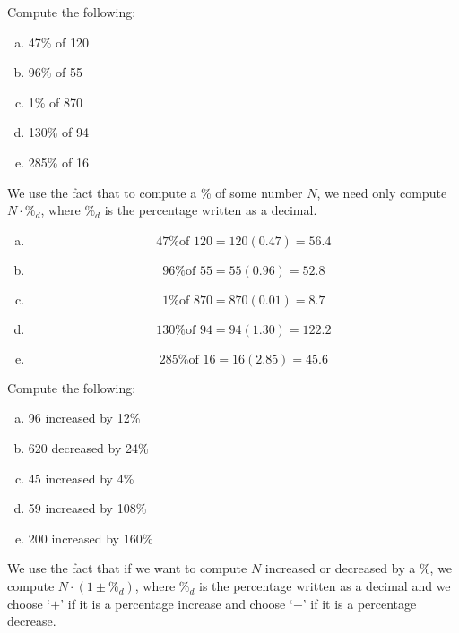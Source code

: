 \documentclass[11pt,letterpaper]{article}
\begin{document}

 Compute the following:
	\begin{enumerate}[(a)]
	\item 47\% of 120
	\item 96\% of 55
	\item 1\% of 870
	\item 130\% of 94
	\item 285\% of 16
	\end{enumerate} \pspace

\sol We use the fact that to compute a \% of some number $N$, we need only compute $N \cdot \%_d$, where $\%_d$ is the percentage written as a decimal. \pspace

\begin{enumerate}[(a)]
\item 
	\[
	\text{47\% of 120}= 120(0.47)= 56.4
	\] \pspace

\item 
	\[
	\text{96\% of 55}= 55(0.96)= 52.8
	\] \pspace

\item 
	\[
	\text{1\% of 870}= 870(0.01)= 8.7
	\] \pspace

\item 
	\[
	\text{130\% of 94}= 94(1.30)= 122.2
	\] \pspace

\item 
	\[
	\text{285\% of 16}= 16(2.85)= 45.6
	\] 
\end{enumerate}



\newpage



 Compute the following:
	\begin{enumerate}[(a)]
	\item 96 increased by 12\%
	\item 620 decreased by 24\%
	\item 45 increased by 4\% 
	\item 59 increased by 108\%
	\item 200 increased by 160\%
	\end{enumerate} \pspace

\sol We use the fact that if we want to compute $N$ increased or decreased by a \%, we compute $N \cdot (1 \pm \%_d)$, where $\%_d$ is the percentage written as a decimal and we choose `$+$' if it is a percentage increase and choose `$-$' if it is a percentage decrease. \pspace
\end{document}
